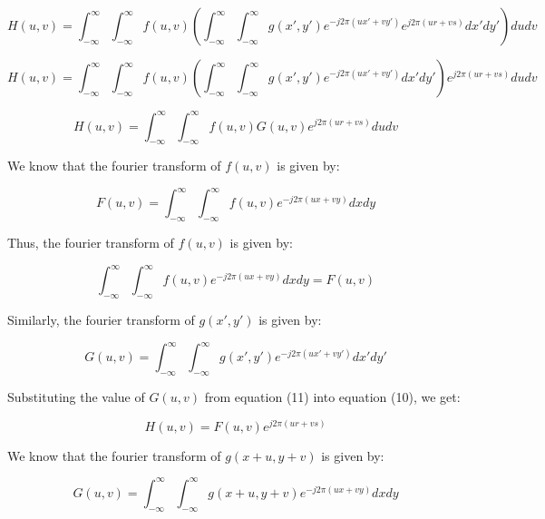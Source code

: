 \documentclass[12pt]{article}
\begin{document}
\begin{equation}
    H(u, v) = \int_{-\infty}^{\infty} \int_{-\infty}^{\infty} f(u, v) \left( \int_{-\infty}^{\infty} \int_{-\infty}^{\infty} g(x', y') e^{-j2\pi(ux'+vy')} e^{j2\pi(ur+vs)} dx' dy' \right) du dv
\end{equation}

\begin{equation}
    H(u, v) = \int_{-\infty}^{\infty} \int_{-\infty}^{\infty} f(u, v) \left( \int_{-\infty}^{\infty} \int_{-\infty}^{\infty} g(x', y') e^{-j2\pi(ux'+vy')} dx' dy' \right) e^{j2\pi(ur+vs)} du dv
\end{equation}

\begin{equation}
    H(u, v) = \int_{-\infty}^{\infty} \int_{-\infty}^{\infty} f(u, v) G(u,v) e^{j2\pi(ur+vs)} du dv
\end{equation}

We know that the fourier transform of $f(u, v)$ is given by:

\begin{equation}
    F(u, v) = \int_{-\infty}^{\infty} \int_{-\infty}^{\infty} f(u, v) e^{-j2\pi(ux+vy)} dx dy
\end{equation}

Thus, the fourier transform of $f(u, v)$ is given by:

\begin{equation}
    \int_{-\infty}^{\infty} \int_{-\infty}^{\infty} f(u, v) e^{-j2\pi(ux+vy)} dx dy = F(u, v)
\end{equation}

Similarly, the fourier transform of $g(x', y')$ is given by:

\begin{equation}
    G(u, v) = \int_{-\infty}^{\infty} \int_{-\infty}^{\infty} g(x', y') e^{-j2\pi(ux'+vy')} dx' dy'
\end{equation}

Substituting the value of $G(u, v)$ from equation (11) into equation (10), we get:

\begin{equation}
    H(u, v) = F(u, v) e^{j2\pi(ur+vs)}
\end{equation}



We know that the fourier transform of $g(x+u, y+v)$ is given by:

\begin{equation}
    G(u, v) = \int_{-\infty}^{\infty} \int_{-\infty}^{\infty} g(x+u, y+v) e^{-j2\pi(ux+vy)} dx dy
\end{equation}
\end{document}
